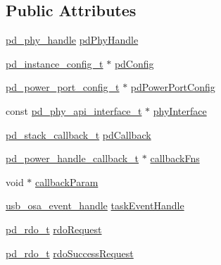 \subsection*{Public Attributes}
\begin{DoxyCompactItemize}
\item 
\hyperlink{group__usb__pd__stack_gab39e13c5c0808b2fe22b7dac49db335a}{pd\-\_\-phy\-\_\-handle} \hyperlink{struct__pd__instance_a7c1184292efe9a5ae30b6ac422c1e9f4}{pd\-Phy\-Handle}
\item 
\hyperlink{group__usb__pd__stack_gafa6034f9e204836697da1f2fc996cbad}{pd\-\_\-instance\-\_\-config\-\_\-t} $\ast$ \hyperlink{struct__pd__instance_a2d9a457d63da9c4cb5e3feece0cbf3ec}{pd\-Config}
\item 
\hyperlink{group__usb__pd__stack_ga1897a14a90aea9e4b0e7cf1e5b4ea449}{pd\-\_\-power\-\_\-port\-\_\-config\-\_\-t} $\ast$ \hyperlink{struct__pd__instance_aa7854ddf70e64f92b178cc5d787037a2}{pd\-Power\-Port\-Config}
\item 
const \hyperlink{group__usb__pd__phy__drv_ga9494f6971e6132cb70c98b92f45af74f}{pd\-\_\-phy\-\_\-api\-\_\-interface\-\_\-t} $\ast$ \hyperlink{struct__pd__instance_adbed7b2cd53df40e0611a8879c903339}{phy\-Interface}
\item 
\hyperlink{group__usb__pd__stack_ga270b6a571db4fa308a1cce3df32f5439}{pd\-\_\-stack\-\_\-callback\-\_\-t} \hyperlink{struct__pd__instance_a3718a4d773d48136d66706ac063ef948}{pd\-Callback}
\item 
\hyperlink{group__usb__pd__stack_gaf1142461de7d7dcc6268c286ba956265}{pd\-\_\-power\-\_\-handle\-\_\-callback\-\_\-t} $\ast$ \hyperlink{struct__pd__instance_a519457e415e4eb39231c3e32316ffc83}{callback\-Fns}
\item 
void $\ast$ \hyperlink{struct__pd__instance_a0eb7710a55cb5eb2a57355d772b26f74}{callback\-Param}
\item 
\hyperlink{group__usb__os__abstraction_gaa5faa1787d0c772a2cf101b3eaf654f6}{usb\-\_\-osa\-\_\-event\-\_\-handle} \hyperlink{struct__pd__instance_ab04e9fcc994b2547509169e07ab21465}{task\-Event\-Handle}
\item 
\hyperlink{group__usb__pd__stack_ga4dcb1103574222cf94d4b45128f2b884}{pd\-\_\-rdo\-\_\-t} \hyperlink{struct__pd__instance_a199dd2b0ea66f8eb7e67714c4a4264a5}{rdo\-Request}
\item 
\hyperlink{group__usb__pd__stack_ga4dcb1103574222cf94d4b45128f2b884}{pd\-\_\-rdo\-\_\-t} \hyperlink{struct__pd__instance_a3e7e606f531f84a6f70e3a49de313f41}{rdo\-Success\-Request}
\item 

\end{DoxyCompactItemize}
